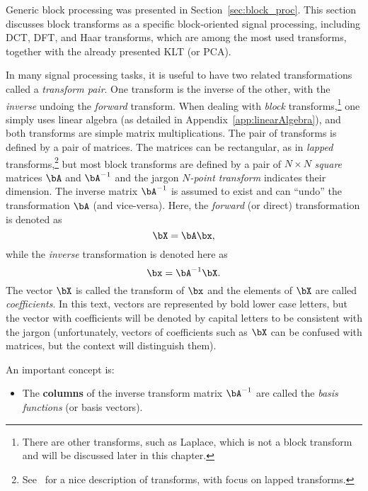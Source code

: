 Generic block processing was presented in Section~\ref{sec:block_proc}.
This section discusses block transforms as a specific block-oriented signal processing,
including DCT, DFT, and Haar transforms, which are among the most used transforms, together with the already presented KLT (or PCA).


In many signal processing tasks, it is useful to have two related transformations called a \emph{transform pair}. One transform is the inverse of the other, with the \emph{inverse} undoing the \emph{forward} transform. When dealing with \emph{block} transforms,\footnote{There are other transforms, such as Laplace, which is not a block transform and will be discussed later in this chapter.} one simply uses linear algebra (as detailed in Appendix~\ref{app:linearAlgebra}), and both transforms are
simple matrix multiplications. The pair of transforms is defined by a pair of matrices.
The matrices can be rectangular, as in \emph{lapped} transforms,\footnote{See~\cite{Malvar92} for a nice description of transforms, with focus on lapped transforms.} but most block transforms are defined by a pair of $N \times N$ \emph{square} matrices $\bA$ and $\bA^{-1}$ and the jargon \emph{$N$-point transform} indicates their dimension. The inverse matrix $\bA^{-1}$ is assumed to exist and can ``undo'' the transformation $\bA$ (and vice-versa). Here, 
the \emph{forward} (or direct) transformation is denoted as
\[
\bX = \bA \bx,
\]
while the \emph{inverse} transformation is denoted here as
\begin{equation}
\label{eq:inverse_transform}
\bx = \bA^{-1} \bX.
\end{equation}
The vector $\bX$ is called the transform of $\bx$ and the elements of $\bX$ are called \emph{coefficients}. 
In this text, vectors are represented by bold lower case letters, but the vector with coefficients will be denoted by capital letters to be consistent with the jargon (unfortunately, vectors of coefficients such as $\bX$ can be confused with matrices, but the context will distinguish them).

An important concept is:
\begin{itemize}
\item The \textbf{columns} of the inverse transform matrix $\bA^{-1}$ are called the \emph{basis functions} (or basis vectors). 
\end{itemize}

